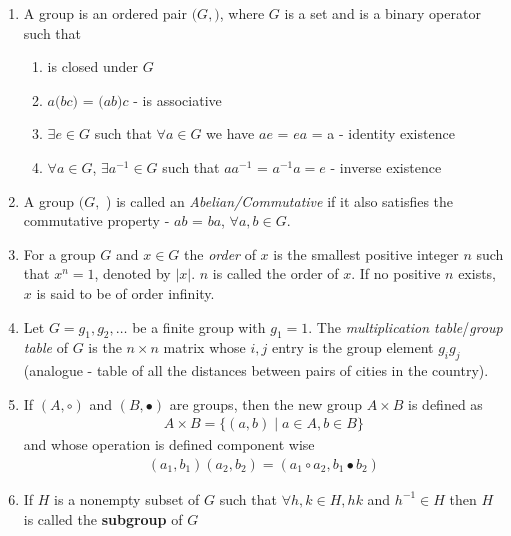 \documentclass[titlepage, 12pt]{article}
\begin{document}
\begin{enumerate}

  \item A group is an ordered pair $(G,$$)$, where $G$ is a set and
     is a binary operator such that

    \begin{enumerate}

      \item {} is closed under $G$

      \item $a$$(b$$c)$ = $(a$$b)$$c$
        -  is associative

      \item $\exists e\in G$ such that $\forall a\in G$ we have
        $a$$e$ = $e$$a$ = a - identity existence

      \item $\forall a\in G$, $\exists a^{-1}\in G$ such that
        $a$$a^{-1}$ = $a^{-1}$$a = e$ - inverse
        existence

    \end{enumerate}

  \item A group $(G,$ ) is called an \textit{Abelian/Commutative} if
    it also satisfies the commutative property - $a$$b$ =
    $b$$a$, $\forall a, b\in G$.

  \item For a group $G$ and $x\in G$ the \textit{order} of $x$ is the smallest
    positive integer $n$ such that $x^n = 1$, denoted by $|x|$. $n$ is
    called the order of $x$. If no positive $n$ exists, $x$ is said to be of
    order infinity.

  \item Let $G = {g_1, g_2,\ldots}$ be a finite group with $g_1 = 1$. The
    \textit{multiplication table}/\textit{group table} of $G$ is the
    $n\times n$ matrix whose $i, j$ entry is the group element $g_ig_j$
    (analogue - table of all the distances between pairs of cities in the
    country).

  \item If $(A, \circ)$ and $(B, \bullet)$ are groups, then the new group $A\times B$ is defined as
    \begin{gather}
      A\times B = \{(a, b)\mid a\in A, b\in B\}
    \end{gather}
    and whose operation is defined component wise
    \begin{gather}
      (a_1, b_1)(a_2, b_2) = (a_1\circ a_2, b_1\bullet b_2)
    \end{gather}

  \item If $H$ is a nonempty subset of $G$ such that $\forall h, k\in H, hk$ and
    $h^{-1}\in H$ then $H$ is called the \textbf{subgroup} of $G$

\end{enumerate}
\end{document}
